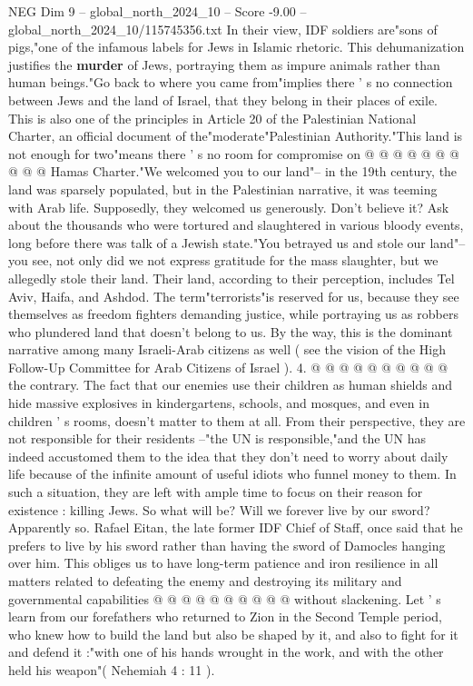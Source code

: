 \begin{textsample}{NEG Dim 9 – global\_north\_2024\_10 – Score -9.00 – global\_north\_2024\_10/115745356.txt}
In their view, IDF soldiers are"sons of pigs,"one of the infamous labels for Jews in Islamic rhetoric.
This dehumanization justifies the \textbf{murder} of Jews, portraying them as impure animals rather than human beings."Go back to where you came from"implies there ' s no connection between Jews and the land of Israel, that they belong in their places of exile.
This is also one of the principles in Article 20 of the Palestinian National Charter, an official document of the"moderate"Palestinian Authority."This land is not enough for two"means there ' s no room for compromise on @ @ @ @ @ @ @ @ @ @ Hamas Charter."We welcomed you to our land"-- in the 19th century, the land was sparsely populated, but in the Palestinian narrative, it was teeming with Arab life.
Supposedly, they welcomed us generously.
Don't believe it?
Ask about the thousands who were tortured and slaughtered in various bloody events, long before there was talk of a Jewish state."You betrayed us and stole our land"-- you see, not only did we not express gratitude for the mass slaughter, but we allegedly stole their land.
Their land, according to their perception, includes Tel Aviv, Haifa, and Ashdod.
The term"terrorists"is reserved for us, because they see themselves as freedom fighters demanding justice, while portraying us as robbers who plundered land that doesn't belong to us.
By the way, this is the dominant narrative among many Israeli-Arab citizens as well ( see the vision of the High Follow-Up Committee for Arab Citizens of Israel ). 4. @ @ @ @ @ @ @ @ @ @ the contrary.
The fact that our enemies use their children as human shields and hide massive explosives in kindergartens, schools, and mosques, and even in children ' s rooms, doesn't matter to them at all.
From their perspective, they are not responsible for their residents --"the UN is responsible,"and the UN has indeed accustomed them to the idea that they don't need to worry about daily life because of the infinite amount of useful idiots who funnel money to them.
In such a situation, they are left with ample time to focus on their reason for existence : killing Jews.
So what will be?
Will we forever live by our sword?
Apparently so.
Rafael Eitan, the late former IDF Chief of Staff, once said that he prefers to live by his sword rather than having the sword of Damocles hanging over him.
This obliges us to have long-term patience and iron resilience in all matters related to defeating the enemy and destroying its military and governmental capabilities @ @ @ @ @ @ @ @ @ @ without slackening.
Let ' s learn from our forefathers who returned to Zion in the Second Temple period, who knew how to build the land but also be shaped by it, and also to fight for it and defend it :"with one of his hands wrought in the work, and with the other held his weapon"( Nehemiah 4 : 11 ).

\end{textsample}

